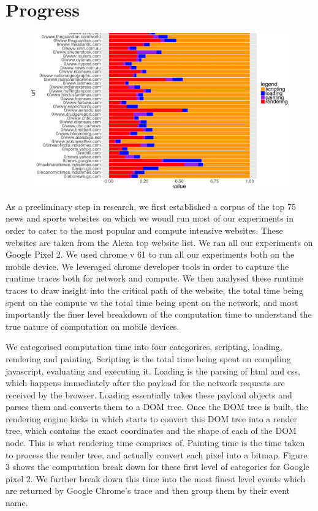 \section{Progress}
\label{sec:Progress}


\begin{figure}[t!]
\centering
\includegraphics[width=0.99\columnwidth, scale=2.0]{figs/comp_1.png}
\label{fig:act_p2}
\end{figure}

As a preeliminary step in research, we first established a corpus of the top
75 news and sports websites on which we woudl run most of our experiments
in order to cater to the most popular and compute intensive websites. 
These websites are taken from the Alexa top website list.
We ran all our experiments on  Google Pixel 2. We used chrome v 61 to run all  our experiments
both on the mobile device. We leveraged chrome developer tools in order
to capture the runtime traces both for network and compute. We then analysed these runtime
traces to draw insight into the critical path of the website, the total time being spent on the 
compute vs the total time being spent on the network, and most importantly the finer
level breakdown of the computation time to understand the true nature of computation on mobile
devices. 

We categorised computation time into four categorires, scripting, loading, rendering and
painting. Scripting is the total time being spent on
compiling javascript, evaluating and executing it. Loading is the parsing of html and css, which happens 
immediately after the payload for the network requests are received by the browser. Loading essentially
takes these payload objects and parses them and converts them to a DOM tree. Once the DOM tree is built,
the rendering engine kicks in which starts to convert this DOM tree into a render tree, which contains the
exact coordinates and the shape of each of the DOM node. This is what rendering time comprises of. 
Painting time is the time taken to process the render tree, and actually convert
each pixel into a bitmap.
Figure 3 shows the computation break down for these first level of categories
for Google pixel 2. We further break down this time into the most finest level events
which are returned by Google Chrome's trace and then group them by their event name.

